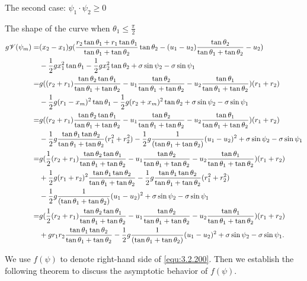\documentclass[letterpaper,reqno,10pt,twoside]{amsart}
\theoremstyle{definition}
\theoremstyle{remark}
\begin{document}
\begin{section}{The second case: $\psi_1\cdot \psi_2\geq 0$ }
\begin{subsection}{The shape of the curve when $\theta_1\leq \frac{\pi}{2}$}
        \begin{align}
            g{\mathscr{V}}(\psi_m)=&(x_2-x_1)g(\frac{r_2\tan\theta_1+r_1\tan\theta_1}{\tan\theta_1+\tan\theta_2}\tan\theta_2-(u_1-u_2)\frac{\tan\theta_2}{\tan\theta_1+\tan\theta_2}-u_2)\notag \\
            &-\frac{1}{2}gx_1^{2}\tan\theta_1-\frac{1}{2}gx_2^{2}\tan\theta_2+\sigma \sin\psi_2-\sigma \sin\psi_1 \notag\\
             =&g((r_2+r_1)\frac{\tan\theta_2\tan\theta_1}{\tan\theta_1+\tan\theta_2}-u_1\frac{\tan\theta_2}{\tan\theta_1+\tan\theta_2}-u_2\frac{\tan\theta_1}{\tan\theta_1+\tan\theta_2})(r_1+r_2) \notag\\
             &-\frac{1}{2}g(r_1-x_m)^{2}\tan\theta_1-\frac{1}{2}g(r_2+x_m)^{2}\tan\theta_2+\sigma \sin\psi_2-\sigma \sin\psi_1 \notag \\
             =&g((r_2+r_1)\frac{\tan\theta_2\tan\theta_1}{\tan\theta_1+\tan\theta_2}-u_1\frac{\tan\theta_2}{\tan\theta_1+\tan\theta_2}-u_2\frac{\tan\theta_1}{\tan\theta_1+\tan\theta_2})(r_1+r_2) \notag \\
             &-\frac{1}{2}g\frac{\tan\theta_1\tan\theta_2}{\tan\theta_1+\tan\theta_2}(r_1^2+r_2^2)-\frac{1}{2}g\frac{1}{(\tan\theta_1+\tan\theta_2)}(u_1-u_2)^{2}+\sigma \sin\psi_2-\sigma \sin\psi_1 \notag\\
              =&g(\frac{1}{2}(r_2+r_1)\frac{\tan\theta_2\tan\theta_1}{\tan\theta_1+\tan\theta_2}-u_1\frac{\tan\theta_2}{\tan\theta_1+\tan\theta_2}-u_2\frac{\tan\theta_1}{\tan\theta_1+\tan\theta_2})(r_1+r_2)\notag \\
               &+\frac{1}{2}g(r_1+r_2)^{2}\frac{\tan\theta_1\tan\theta_2}{\tan\theta_1+\tan\theta_2}-\frac{1}{2}g\frac{\tan\theta_1\tan\theta_2}{\tan\theta_1+\tan\theta_2}(r_1^2+r_2^2)\notag \\
                &-\frac{1}{2}g\frac{1}{(\tan\theta_1+\tan\theta_2)}(u_1-u_2)^{2}+\sigma \sin\psi_2-\sigma \sin\psi_1 \notag\\
                 =&g(\frac{1}{2}(r_2+r_1)\frac{\tan\theta_2\tan\theta_1}{\tan\theta_1+\tan\theta_2}-u_1\frac{\tan\theta_2}{\tan\theta_1+\tan\theta_2}-u_2\frac{\tan\theta_1}{\tan\theta_1+\tan\theta_2})(r_1+r_2) \notag \\
                 &+gr_1r_2\frac{\tan\theta_1\tan\theta_2}{\tan\theta_1+\tan\theta_2}-\frac{1}{2}g\frac{1}{(\tan\theta_1+\tan\theta_2)}(u_1-u_2)^{2}+\sigma \sin\psi_2-\sigma \sin\psi_1 \label{equ:3.2.200}.
        \end{align}

        
        \noindent We use $f(\psi)$ to denote right-hand side of \eqref{equ:3.2.200}. Then we establish the following theorem to discuss the asymptotic behavior of $f(\psi)$.


\end{subsection}
\end{section}
\end{document}
